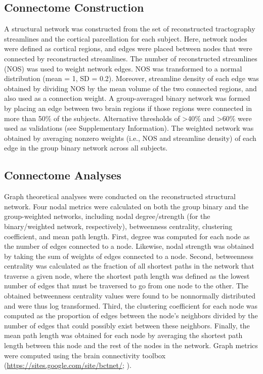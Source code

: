 \begin{refsection}
\subsection*{Connectome Construction}
A structural network was constructed from the set of reconstructed tractography streamlines and the cortical parcellation for each subject. Here, network nodes were defined as cortical regions, and edges were placed between nodes that were connected by reconstructed streamlines. The number of reconstructed streamlines (NOS) was used to weight network edges. NOS was transformed to a normal distribution (mean = 1, SD = 0.2). Moreover, streamline density of each edge was obtained by dividing NOS by the mean volume of the two connected regions, and also used as a connection weight. A group-averaged binary network was formed by placing an edge between two brain regions if those regions were connected in more than 50\% of the subjects. Alternative thresholds of >40\% and >60\% were used as validations (see Supplementary Information). The weighted network was obtained by averaging nonzero weights (i.e., NOS and streamline density) of each edge in the group binary network across all subjects.

\subsection*{Connectome Analyses}
Graph theoretical analyses were conducted on the reconstructed structural network. Four nodal metrics were calculated on both the group binary and the group-weighted networks, including nodal degree/strength (for the binary/weighted network, respectively), betweenness centrality, clustering coefficient, and mean path length. First, degree was computed for each node as the number of edges connected to a node. Likewise, nodal strength was obtained by taking the sum of weights of edges connected to a node. Second, betweenness centrality was calculated as the fraction of all shortest paths in the network that traverse a given node, where the shortest path length was defined as the lowest number of edges that must be traversed to go from one node to the other. The obtained betweenness centrality values were found to be nonnormally distributed and were thus log transformed. Third, the clustering coefficient for each node was computed as the proportion of edges between the node's neighbors divided by the number of edges that could possibly exist between these neighbors. Finally, the mean path length was obtained for each node by averaging the shortest path length between this node and the rest of the nodes in the network. Graph metrics were computed using the brain connectivity toolbox (\url{https://sites.google.com/site/bctnet/}; \citep{RUBINOV20101059}).



\end{refsection}
